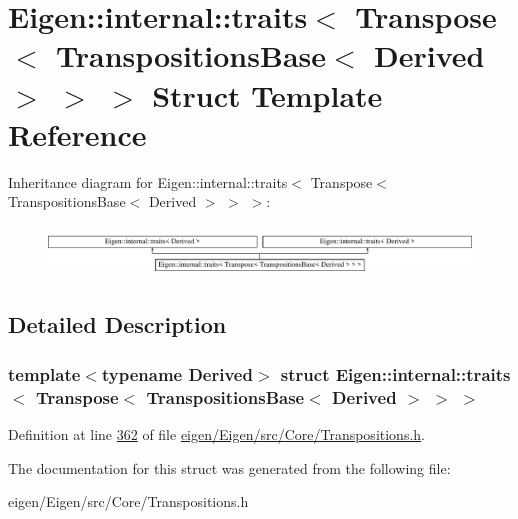\hypertarget{struct_eigen_1_1internal_1_1traits_3_01_transpose_3_01_transpositions_base_3_01_derived_01_4_01_4_01_4}{}\section{Eigen\+:\+:internal\+:\+:traits$<$ Transpose$<$ Transpositions\+Base$<$ Derived $>$ $>$ $>$ Struct Template Reference}
\label{struct_eigen_1_1internal_1_1traits_3_01_transpose_3_01_transpositions_base_3_01_derived_01_4_01_4_01_4}
Inheritance diagram for Eigen\+:\+:internal\+:\+:traits$<$ Transpose$<$ Transpositions\+Base$<$ Derived $>$ $>$ $>$\+:\begin{figure}[H]
\begin{center}
\leavevmode
\includegraphics[height=1.339713cm]{struct_eigen_1_1internal_1_1traits_3_01_transpose_3_01_transpositions_base_3_01_derived_01_4_01_4_01_4}
\end{center}
\end{figure}


\subsection{Detailed Description}
\subsubsection*{template$<$typename Derived$>$\newline
struct Eigen\+::internal\+::traits$<$ Transpose$<$ Transpositions\+Base$<$ Derived $>$ $>$ $>$}



Definition at line \hyperlink{eigen_2_eigen_2src_2_core_2_transpositions_8h_source_l00362}{362} of file \hyperlink{eigen_2_eigen_2src_2_core_2_transpositions_8h_source}{eigen/\+Eigen/src/\+Core/\+Transpositions.\+h}.



The documentation for this struct was generated from the following file\+:\begin{DoxyCompactItemize}
\item 
eigen/\+Eigen/src/\+Core/\+Transpositions.\+h\end{DoxyCompactItemize}
